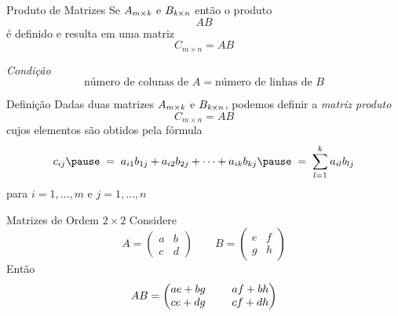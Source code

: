 \documentclass[fleqn,aspectratio=169,12pt]{beamer}
\begin{document}
\begin{frame}{Produto de Matrizes}
Se
\(
  A_{m\times \emph{k}}
\)
\; e \;
\(
  B_{\emph{k}\times n}
\)
\pause
então o produto
\[
  AB
\]
\pause
é definido e resulta em uma matriz
\[
  C_{m\times n} = AB
\]

\pause
\medskip
\emph{Condição}
\[
\text{número de colunas de }A
=
\text{número de linhas de }B
\]
\end{frame}

\begin{frame}{Definição}
  Dadas duas matrizes $A_{m \times \emph{k}}$ e $B_{\emph{k} \times n}$,
  \pause
  podemos definir a \emph{matriz produto}
  \[
    C_{m \times n} = AB
  \]
  \pause
  cujos elementos são obtidos pela fórmula
  \[
    c_{ij}
    \pause
    \;=\; a_{i1} b_{1j} + a_{i2} b_{2j} + \cdots + a_{ik} b_{kj}
    \pause
    \;=\; \sum_{l=1}^{k} a_{il} b_{lj}
  \]
  \pause
  para $i = 1, \dots, m$ e $j = 1, \dots, n$
\end{frame}

\begin{frame}{Matrizes de Ordem $2\times 2$}
Considere
\[
  A =
  \begin{pmatrix}
    a & b \\
    c & d
  \end{pmatrix}
  \qquad
  B =
  \begin{pmatrix}
    e & f \\
    g & h
  \end{pmatrix}
\]
\pause
Então
\[
  \setlength{\arraycolsep}{12pt}
  AB =
  \begin{pmatrix}
    ae+bg & af+bh \\
    ce+dg & cf+dh
  \end{pmatrix}
\]
\end{frame}





\end{document}
